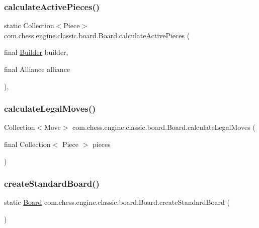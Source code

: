 \subsubsection{\texorpdfstring{calculateActivePieces()}{calculateActivePieces()}}
{\footnotesize\ttfamily static Collection$<$Piece$>$ com.\+chess.\+engine.\+classic.\+board.\+Board.\+calculate\+Active\+Pieces (\begin{DoxyParamCaption}\item[{final \mbox{\hyperlink{classcom_1_1chess_1_1engine_1_1classic_1_1board_1_1_board_1_1_builder}{Builder}}}]{builder,  }\item[{final Alliance}]{alliance }\end{DoxyParamCaption})\hspace{0.3cm}{\ttfamily [static]}, {\ttfamily [private]}}

\mbox{\label{classcom_1_1chess_1_1engine_1_1classic_1_1board_1_1_board_a4518ab116ca4d51efe4318f8f122c7e1}} 
\subsubsection{\texorpdfstring{calculateLegalMoves()}{calculateLegalMoves()}}
{\footnotesize\ttfamily Collection$<$Move$>$ com.\+chess.\+engine.\+classic.\+board.\+Board.\+calculate\+Legal\+Moves (\begin{DoxyParamCaption}\item[{final Collection$<$ Piece $>$}]{pieces }\end{DoxyParamCaption})\hspace{0.3cm}{\ttfamily [private]}}

\mbox{\label{classcom_1_1chess_1_1engine_1_1classic_1_1board_1_1_board_a5c85105e2c754cab7e37adaeb4243f1b}} 
\subsubsection{\texorpdfstring{createStandardBoard()}{createStandardBoard()}}
{\footnotesize\ttfamily static \mbox{\hyperlink{classcom_1_1chess_1_1engine_1_1classic_1_1board_1_1_board}{Board}} com.\+chess.\+engine.\+classic.\+board.\+Board.\+create\+Standard\+Board (\begin{DoxyParamCaption}{ }\end{DoxyParamCaption})\hspace{0.3cm}{\ttfamily [static]}}


